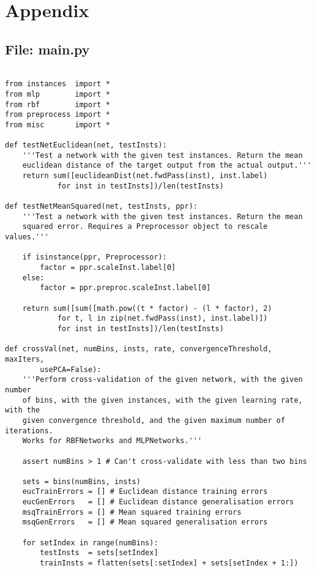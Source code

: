 \documentclass{article}
\begin{document}
\section*{Appendix}
\subsection*{File: main.py}
\begin{verbatim}

from instances  import *
from mlp        import *
from rbf        import *
from preprocess import *
from misc       import *

def testNetEuclidean(net, testInsts):
    '''Test a network with the given test instances. Return the mean
    euclidean distance of the target output from the actual output.'''
    return sum([euclideanDist(net.fwdPass(inst), inst.label)
            for inst in testInsts])/len(testInsts)

def testNetMeanSquared(net, testInsts, ppr):
    '''Test a network with the given test instances. Return the mean
    squared error. Requires a Preprocessor object to rescale values.'''

    if isinstance(ppr, Preprocessor):
        factor = ppr.scaleInst.label[0]
    else:
        factor = ppr.preproc.scaleInst.label[0]

    return sum([sum([math.pow((t * factor) - (l * factor), 2)
            for t, l in zip(net.fwdPass(inst), inst.label)])
            for inst in testInsts])/len(testInsts)

def crossVal(net, numBins, insts, rate, convergenceThreshold, maxIters,
        usePCA=False):
    '''Perform cross-validation of the given network, with the given number
    of bins, with the given instances, with the given learning rate, with the
    given convergence threshold, and the given maximum number of iterations.
    Works for RBFNetworks and MLPNetworks.'''

    assert numBins > 1 # Can't cross-validate with less than two bins

    sets = bins(numBins, insts)
    eucTrainErrors = [] # Euclidean distance training errors
    eucGenErrors   = [] # Euclidean distance generalisation errors
    msqTrainErrors = [] # Mean squared training errors
    msqGenErrors   = [] # Mean squared generalisation errors

    for setIndex in range(numBins):
        testInsts  = sets[setIndex]
        trainInsts = flatten(sets[:setIndex] + sets[setIndex + 1:])


\end{verbatim}
\end{document}
